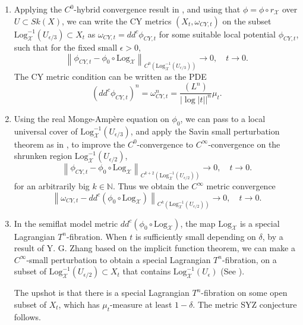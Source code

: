 \documentclass[a4paper]{article}
\theoremstyle{definition}
\newcommand{\N}{\mathbb{N}}
\newcommand{\norm}[1]{\left\lVert#1\right\rVert}
\begin{document}
\begin{enumerate}
	
	
	\item 
Applying the $C^0$-hybrid convergence result in \cite{Litheta}, and using that $\phi=\phi\circ r_\mathcal{X}$ over $U\subset Sk(X)$, we can write the CY metrics $(X_t, \omega_{CY,t})$ on the subset $\text{Log}_\mathcal{X}^{-1} (U_{\epsilon/3})\subset X_t$  as $\omega_{CY,t}= dd^c \phi_{CY,t}$ for some suitable local potential $\phi_{CY,t}$, such that for the fixed small $\epsilon>0$,
\[
\norm{ \phi_{CY,t}-  \phi_0\circ \text{Log}_\mathcal{X} }_{C^0(   \text{Log}_\mathcal{X}^{-1} (U_{\epsilon/3})  )} \to 0, \quad t\to 0.
\]
The CY metric condition can be written as the PDE
\[
(dd^c \phi_{CY,t} )^n= \omega_{CY,t}^n= \frac{ (L^n) }{ |\log |t||^n   } \mu_t.
\]
	
	
	
	\item  Using the real Monge-Amp\`ere equation on $\phi_0$, we can pass to a local universal cover of $\text{Log}_\mathcal{X}^{-1} (U_{\epsilon/3})$, and apply the Savin small perturbation theorem as in \cite[Thm. 4.8]{LiNA}, to improve the $C^0$-convergence to $C^\infty$-convergence on the shrunken region $\text{Log}_\mathcal{X}^{-1} (U_{\epsilon/2})$,
	\[
	\norm{ \phi_{CY,t}-  \phi_0\circ \text{Log}_\mathcal{X} }_{C^{k+2}(   \text{Log}_\mathcal{X}^{-1} (U_{\epsilon/2})  )} \to 0, \quad t\to 0.
	\]
	for an arbitrarily big $k\in \N$. Thus we obtain the $C^\infty$ metric convergence
	\[
	\norm{ \omega_{CY,t}-    dd^c (\phi_0\circ \text{Log}_\mathcal{X}) }_{C^k(   \text{Log}_\mathcal{X}^{-1} (U_{\epsilon/2})  )} \to 0, \quad t\to 0.
	\]
	
	

	
	\item In the semiflat model metric $  dd^c (\phi_0\circ \text{Log}_\mathcal{X})$, the map $\text{Log}_\mathcal{X}$ is a special Lagrangian $T^n$-fibration. When $t$ is sufficiently small depending on $\delta$, 
	by a result of Y. G. Zhang based on the implicit function theorem, we can make a $C^\infty$-small perturbation to obtain a special Lagrangian $T^n$-fibration, on a subset of $\text{Log}_\mathcal{X}^{-1} (U_{\epsilon/2}) \subset X_t $ that contains $\text{Log}_\mathcal{X}^{-1} (U_{\epsilon})  $ (See \cite[Thm. 4.9]{LiNA}). 
	
	
	The upshot is that there is a special Lagrangian $T^n$-fibration on some open subset of $X_t$, which has $\mu_t$-measure at least $1-\delta$. The metric SYZ conjecture follows.

	
	
\end{enumerate}
\end{document}
